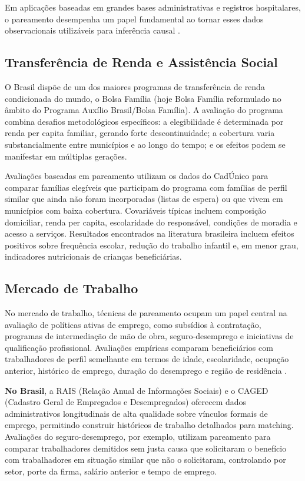 \documentclass[12pt,a4paper]{article}
\begin{document}
Em aplicações baseadas em grandes bases administrativas e registros hospitalares, o pareamento desempenha um papel fundamental ao tornar esses dados observacionais utilizáveis para inferência causal \citep{imbens2015causal}.

\subsection*{Transferência de Renda e Assistência Social}

O Brasil dispõe de um dos maiores programas de transferência de renda condicionada do mundo, o Bolsa Família (hoje Bolsa Família reformulado no âmbito do Programa Auxílio Brasil/Bolsa Família). A avaliação do programa combina desafios metodológicos específicos: a elegibilidade é determinada por renda per capita familiar, gerando forte descontinuidade; a cobertura varia substancialmente entre municípios e ao longo do tempo; e os efeitos podem se manifestar em múltiplas gerações.

Avaliações baseadas em pareamento utilizam os dados do CadÚnico para comparar famílias elegíveis que participam do programa com famílias de perfil similar que ainda não foram incorporadas (listas de espera) ou que vivem em municípios com baixa cobertura. Covariáveis típicas incluem composição domiciliar, renda per capita, escolaridade do responsável, condições de moradia e acesso a serviços. Resultados encontrados na literatura brasileira incluem efeitos positivos sobre frequência escolar, redução do trabalho infantil e, em menor grau, indicadores nutricionais de crianças beneficiárias.

\subsection*{Mercado de Trabalho}

No mercado de trabalho, técnicas de pareamento ocupam um papel central na avaliação de políticas ativas de emprego, como subsídios à contratação, programas de intermediação de mão de obra, seguro-desemprego e iniciativas de qualificação profissional. Avaliações empíricas comparam beneficiários com trabalhadores de perfil semelhante em termos de idade, escolaridade, ocupação anterior, histórico de emprego, duração do desemprego e região de residência \citep{heckman1998characterizing,caliendo2008some,lechner2011matching}.

\textbf{No Brasil}, a RAIS (Relação Anual de Informações Sociais) e o CAGED (Cadastro Geral de Empregados e Desempregados) oferecem dados administrativos longitudinais de alta qualidade sobre vínculos formais de emprego, permitindo construir históricos de trabalho detalhados para matching. Avaliações do seguro-desemprego, por exemplo, utilizam pareamento para comparar trabalhadores demitidos sem justa causa que solicitaram o benefício com trabalhadores em situação similar que não o solicitaram, controlando por setor, porte da firma, salário anterior e tempo de emprego.
\end{document}
